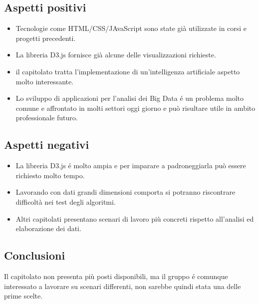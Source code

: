 \subsection{Aspetti positivi}
\begin{itemize}
\item Tecnologie come HTML/CSS/JAvaScript sono state già utilizzate in corsi e progetti precedenti.
\item La libreria D3.js fornisce già alcune delle visualizzazioni richieste.
\item il capitolato tratta l'implementazione di un'intelligenza artificiale aspetto molto interessante.
\item Lo sviluppo di applicazioni per l'analisi dei Big Data é un problema molto comune e affrontato in molti settori oggi giorno e può risultare utile in ambito professionale futuro.
\end{itemize}

\subsection{Aspetti negativi}
\begin{itemize}
\item La libreria D3.js é molto ampia e per imparare a padroneggiarla può essere richiesto molto tempo.
\item Lavorando con dati grandi dimensioni comporta si potranno riscontrare difficoltà nei test degli algoritmi.
\item Altri capitolati presentano scenari di lavoro più concreti rispetto all'analisi ed elaborazione dei dati.
\end{itemize}


\subsection{Conclusioni}
Il capitolato non presenta più posti disponibili, ma il gruppo é comunque interessato a lavorare su scenari differenti, non sarebbe quindi stata una delle prime scelte.